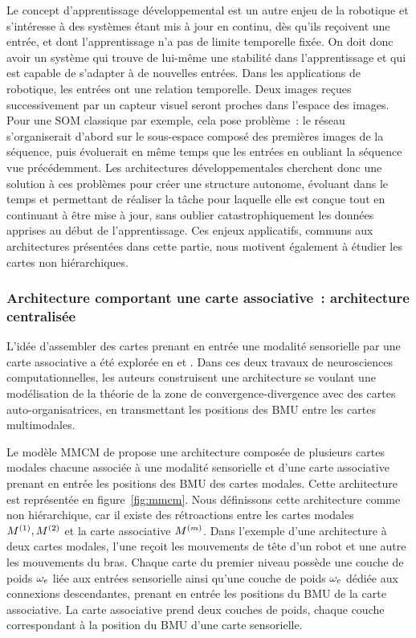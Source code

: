 \documentclass[../main]{subfiles}
\begin{document}
Le concept d'apprentissage développemental est un autre enjeu de la robotique et s'intéresse à des systèmes étant mis à jour en continu, dès qu'ils reçoivent une entrée, et dont l'apprentissage n'a pas de limite temporelle fixée. 
On doit donc avoir un système qui trouve de lui-même une stabilité dans l'apprentissage et qui est capable de s'adapter à de nouvelles entrées.
Dans les applications de robotique, les entrées ont une relation temporelle. Deux images reçues successivement par un capteur visuel seront proches dans l'espace des images. Pour une SOM classique par exemple, cela pose problème~: le réseau s'organiserait d'abord sur le sous-espace composé des premières images de la séquence, puis évoluerait en même temps que les entrées en oubliant la séquence vue précédemment.
Les architectures développementales cherchent donc une solution à ces problèmes pour créer une structure autonome, évoluant dans le temps et permettant de réaliser la tâche pour laquelle elle est conçue tout en continuant à être mise à jour, sans oublier catastrophiquement les données apprises au début de l'apprentissage.
Ces enjeux applicatifs, communs aux architectures présentées dans cette partie, nous motivent également à étudier les cartes non hiérarchiques.

\subsubsection{Architecture comportant une carte associative~: architecture centralisée}

L'idée d'assembler des cartes prenant en entrée une modalité sensorielle par une carte associative a été explorée en \cite{dominey13} et \cite{escobar-juarez_self-organized_2016}.
Dans ces deux travaux de neurosciences computationnelles, les auteurs construisent une architecture se voulant une modélisation de la théorie de la zone de convergence-divergence \parencite{Edelman1982GroupSA} avec des cartes auto-organisatrices, en transmettant les positions des BMU entre les cartes multimodales. 

Le modèle MMCM de \cite{dominey13} propose une architecture composée de plusieurs cartes modales chacune associée à une modalité sensorielle et d'une carte associative prenant en entrée les positions des BMU des cartes modales. Cette architecture est représentée en figure~\ref{fig:mmcm}. 
Nous définissons cette architecture comme non hiérarchique, car il existe des rétroactions entre les cartes modales $M^{({1})},M^{({2})}$ et la carte associative $M^{({m})}$.
Dans l'exemple d'une architecture à deux cartes modales, l'une reçoit les mouvements de tête d'un robot et une autre les mouvements du bras.
Chaque carte du premier niveau possède une couche de poids $\omega_e$ liée aux entrées sensorielle ainsi qu'une couche de poids $ \omega_c$ dédiée aux connexions descendantes, prenant en entrée les positions du BMU de la carte associative.
La carte associative prend deux couches de poids, chaque couche correspondant à la position du BMU d'une carte sensorielle.
\end{document}
